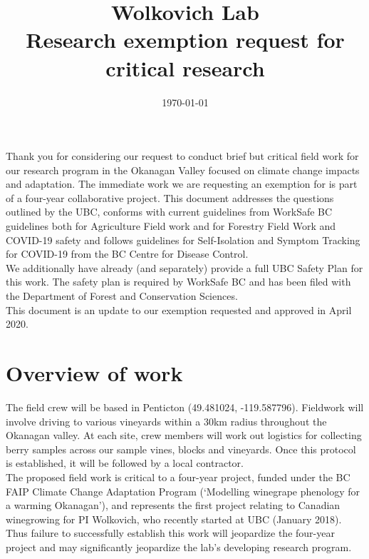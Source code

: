 \documentclass[11pt,letter]{article}
\begin{document}

\renewcommand{\refname}{\CHead{}}

\title{Wolkovich Lab \\ Research exemption request for critical research}
\date{\today}
\maketitle

Thank you for considering our request to conduct brief but critical field work for our research program in the Okanagan Valley focused on climate change impacts and adaptation. The immediate work we are requesting an exemption for is part of a four-year collaborative project. This document addresses the questions outlined by the UBC, conforms with current guidelines from WorkSafe BC guidelines both for Agriculture Field work and for Forestry Field Work and COVID-19 safety and follows guidelines for Self-Isolation and Symptom Tracking for COVID-19 from the BC Centre for Disease Control.\\

We additionally have already (and separately) provide a full UBC Safety Plan for this work. The safety plan is required by WorkSafe BC and has been filed with the Department of Forest and Conservation Sciences. \\

This document is an update to our exemption requested and approved in April 2020. 

\section{Overview of work}
The field crew will be based in Penticton (49.481024, -119.587796). Fieldwork will involve driving to various vineyards within a 30km radius throughout the Okanagan valley. At each site, crew members will work out logistics for collecting berry samples across our sample vines, blocks and vineyards. Once this protocol is established, it will be followed by a local contractor. \\

The proposed field work is critical to a four-year project, funded under the BC FAIP Climate Change Adaptation Program (`Modelling winegrape phenology for a warming Okanagan'), and represents the first project relating to Canadian winegrowing for PI Wolkovich, who recently started at UBC (January 2018). Thus failure to successfully establish this work will jeopardize the four-year project and may significantly jeopardize the lab's developing research program. 
\end{document}
